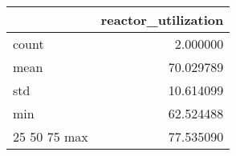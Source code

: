 \begin{tabular}{lr}
\toprule
 & reactor\_utilization \\
\midrule
count & 2.000000 \\
mean & 70.029789 \\
std & 10.614099 \\
min & 62.524488 \\
25%
50%
75%
max & 77.535090 \\
\bottomrule
\end{tabular}

